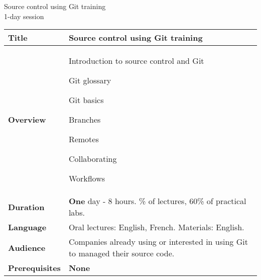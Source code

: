 \documentclass[a4paper,12pt,obeyspaces,spaces,hyphens]{article}
\begin{document}
\thispagestyle{fancy}

\setlength{\arrayrulewidth}{0.8pt}

\begin{center}
\LARGE
Source control using Git training\\
\large
1-day session
\end{center}
\vspace{1cm}

\small
{}

 {
  \begin{tabularx}{\textwidth}{|g|h|}
    {\bf Title} & {\bf Source control using Git training} \\
    \hline

    {\bf Overview} &
    Introduction to source control and Git \par
    Git glossary\par
    Git basics\par
    Branches\par
    Remotes\par
    Collaborating\par
    Workflows\par
    \\
    \hline

    {\bf Duration} & {\bf One} day - 8 hours.
    \% of lectures, 60\% of practical labs. \\
    \hline

    {\bf Language} & Oral lectures: English, French.
    \newline Materials: English.\\
    \hline

    {\bf Audience} & Companies already using or interested in using
    Git to managed their source code.\\
    \hline

    {\bf Prerequisites} & {\bf None}\\
    \hline
  \end{tabularx}

}
\end{document}
